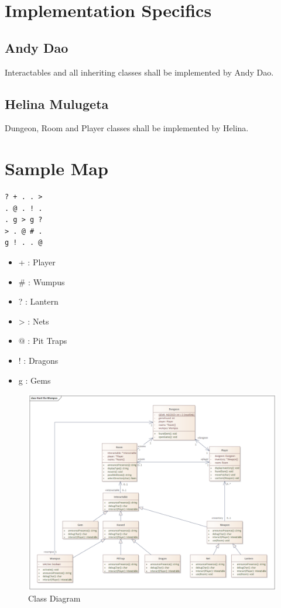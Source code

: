 \documentclass{formalLabReport} %
\begin{document}
\newpage

\section{Implementation Specifics}
\subsection{Andy Dao}

Interactables and all inheriting classes shall be implemented by Andy Dao.

\subsection{Helina Mulugeta}

Dungeon, Room and Player classes shall be implemented by Helina.\newline

\section{Sample Map}

\begin{verbatim}
? + . . >
. @ . ! .
. g > g ?
> . @ # .
g ! . . @
\end{verbatim}

\begin{itemize}
    \item + : Player
    \item \# : Wumpus
    \item ? : Lantern
    \item > : Nets
    \item $@$ : Pit Traps
    \item ! : Dragons
    \item g : Gems
\end{itemize}

\begin{figure}
    \centering
    \includegraphics[width=1\linewidth]{docs/Class Diagram.png}
    \caption{Class Diagram}
    \label{fig:enter-label}
\end{figure}
\end{document}
